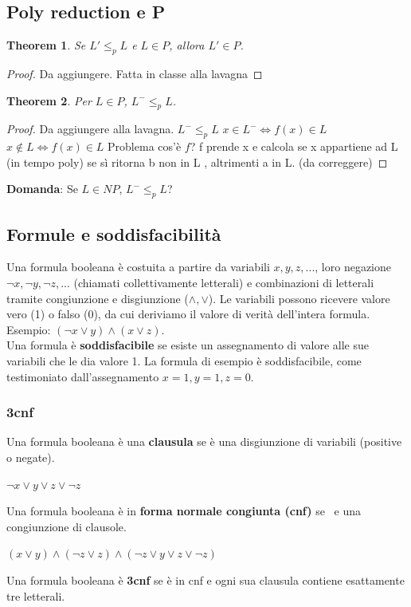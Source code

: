 \documentclass[a4paper, 12pt]{article}
\newtheorem{theorem}{Theorem}[section]
\begin{document}
\subsection{Poly reduction e P}
\begin{theorem}
Se $L' \leq_p L$ e $L \in P$, allora $L' \in P$.
\end{theorem}
\begin{proof}
Da aggiungere. Fatta in classe alla lavagna
\end{proof}
\begin{theorem}
Per $L \in P$, $L^{-} \leq_p L$. 
\end{theorem}
\begin{proof}
Da aggiungere alla lavagna.
$L^{-} \leq_p L$
$x \in L^{-} \iff f(x) \in L$
$x \notin L \iff f(x) \in L$
Problema cos'\`e $f$?
f prende x e calcola se x appartiene ad L (in tempo poly) se s\`i ritorna b non in L , altrimenti a in L. (da correggere)
\end{proof}
\textbf{Domanda}: Se $L \in NP$, $L^{-} \leq_p L$?
\subsection{Formule e soddisfacibilit\`a}
Una formula booleana \`e costuita a partire da variabili $x,y,z,...$, loro negazione $\lnot x, \lnot y, \lnot z,...$ (chiamati collettivamente letterali) e combinazioni di letterali tramite congiunzione e disgiunzione ($\land, \lor $). Le variabili possono ricevere valore vero (1) o falso (0), da cui deriviamo il valore di verit\`a dell'intera formula.\\
Esempio: $(\lnot x \lor y) \land (x \lor z)$.\\
Una formula \`e \textbf{soddisfacibile} se esiste un assegnamento di valore alle sue variabili che le dia valore 1. La formula di esempio \`e soddisfacibile, come testimoniato dall'assegnamento $x=1,y=1,z=0$.
\subsubsection{3cnf}
Una formula booleana \`e una \textbf{clausula} se \`e una disgiunzione di variabili (positive o negate).
\begin{center}
$\lnot x \lor y \lor z \lor \lnot z$
\end{center}
Una formula booleana \`e in \textbf{forma normale congiunta (cnf)} se \	e una congiunzione di clausole.
\begin{center}
$(x \lor y) \land (\lnot z \lor z) \land (\lnot z \lor y \lor z \lor \lnot z)$
\end{center}
Una formula booleana \`e \textbf{3cnf} se \`e in cnf e ogni sua clausula contiene esattamente tre letterali.
\end{document}
